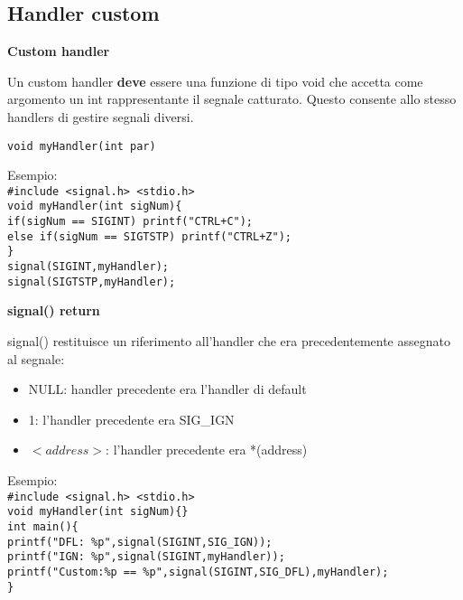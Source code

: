 \begin{flushleft}
  \subsection{Handler custom}
  \begin{flushleft}
    \textbf{Custom handler}\par 
    Un custom handler \textbf{deve} essere una funzione di tipo void che accetta come 
    argomento un int rappresentante il segnale catturato. Questo consente allo stesso 
    handlers di gestire segnali diversi.\par 
    \texttt{void myHandler(int par)}\par 
    Esempio: \\
    \texttt{\#include <signal.h> <stdio.h> \\
    void myHandler(int sigNum)\{\\
    \halftab if(sigNum == SIGINT) printf("CTRL+C\n");\\
    \halftab else if(sigNum == SIGTSTP) printf("CTRL+Z\n");\\
    \} \\
    signal(SIGINT,myHandler); \\
    signal(SIGTSTP,myHandler);\\}
  \end{flushleft}
  \begin{flushleft}
    \textbf{signal() return}\par 
    signal() restituisce un riferimento all’handler che era precedentemente assegnato al 
    segnale: 
    \begin{itemize}
      \item NULL: handler precedente era l'handler di default
      \item 1: l'handler precedente era SIG\_IGN
      \item $<address>$: l'handler precedente era *(address)
    \end{itemize}
    Esempio: \\
    \texttt{\#include <signal.h> <stdio.h> \\
    void myHandler(int sigNum)\{\}\\
    int main()\{\\
    \halftab printf("DFL: \%p\n",signal(SIGINT,SIG\_IGN));\\
    \halftab printf("IGN: \%p\n",signal(SIGINT,myHandler));\\
    \halftab printf("Custom:\%p == \%p\n",signal(SIGINT,SIG\_DFL),myHandler);\\
    \}}
  \end{flushleft}

\end{flushleft}

